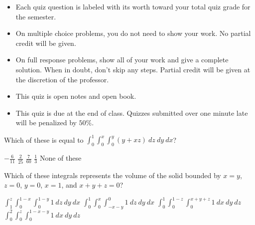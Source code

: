 \documentclass[12pt]{exam}
\newcommand{\<}{(}
\renewcommand{\>}{)}
\begin{document}
\begin{center}
\end{center}
\vspace{0.1in}

\vspace{12pt}

\begin{itemize}
  \item Each quiz question is labeled with its worth toward your total quiz
        grade for the semester.
  \item On multiple choice problems, you do not need to show your work. No
        partial credit will be given.
  \item On full response problems, show all of your work and give a
        complete solution. When in doubt, don't skip any steps. Partial
        credit will be given at the discretion of the professor.
  \item This quiz is open notes and open book.
  \item This quiz is due at the end of class. Quizzes submitted over one minute
        late will be penalized by \(50\%\).
\end{itemize}

\newpage

\begin{questions}

\question[10]
Which of these is equal to \(\int_0^1\int_0^x\int_0^y(y+xz)~dz~dy~dx\)?

\begin{checkboxes}
\choice \(-\frac{6}{11}\)
\choice \(\frac{2}{25}\)
\choice \(\frac{7}{60}\)
\choice \(\frac{1}{3}\)
\choice None of these
\end{checkboxes}

\vfill
\question[10]
Which of these integrals represents the volume of the solid bounded by
\(x=y\), \(z=0\), \(y=0\), \(x=1\), and \(x+y+z=0\)?

\begin{checkboxes}
\choice \(\int_1^z\int_0^{1-x}\int_0^{1-y}1~dz~dy~dx\)
\choice \(\int_0^1\int_0^{x}\int_{-x-y}^0 1~dz~dy~dx\)
\choice \(\int_0^1\int_0^{1-z}\int_0^{x+y+z}1~dx~dy~dz\)
\choice \(\int_0^2\int_0^{z}\int_0^{1-x-y}1~dx~dy~dz\)
\end{checkboxes}

\vfill
\end{questions}
\end{document}
